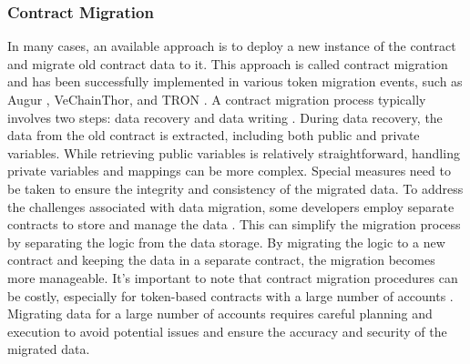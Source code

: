 \documentclass[manuscript,screen]{acmart}
\begin{document}
\subsubsection{Contract Migration}
In many cases, an available approach is to deploy a new instance of the contract and migrate old contract data to it. This approach is called contract migration and has been successfully implemented in various token migration events, such as Augur \cite{Augur}, VeChainThor\cite{vechain}, and TRON \cite{TRON}. A contract migration process typically involves two steps: data recovery and data writing \cite{josselinfeist}. 
During data recovery, the data from the old contract is extracted, including both public and private variables. While retrieving public variables is relatively straightforward, handling private variables and mappings can be more complex. Special measures need to be taken to ensure the integrity and consistency of the migrated data. To address the challenges associated with data migration, some developers employ separate contracts to store and manage the data \cite{ProxyPatterns}. This can simplify the migration process by separating the logic from the data storage. By migrating the logic to a new contract and keeping the data in a separate contract, the migration becomes more manageable.
It's important to note that contract migration procedures can be costly, especially for token-based contracts with a large number of accounts \cite{josselinfeist}. Migrating data for a large number of accounts requires careful planning and execution to avoid potential issues and ensure the accuracy and security of the migrated data.
\end{document}
